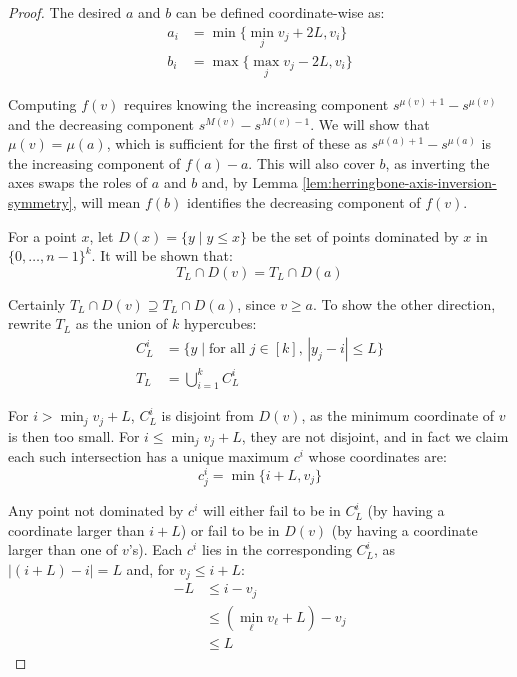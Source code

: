 \documentclass[11pt]{article}
\begin{document}
\lemmaoutsidequerysimulation*
\begin{proof}
    The desired $a$ and $b$ can be defined coordinate-wise as:
    \begin{align}
        a_i &= \min \{ \min_j v_j + 2L, v_i\} \\
        b_i &= \max \{ \max_j v_j - 2L, v_i\}
    \end{align}
    
    Computing $f(v)$ requires knowing the increasing component $s^{\mu(v)+1} - s^{\mu(v)}$ and the decreasing component $s^{M(v)} - s^{M(v)-1}$. We will show that $\mu(v) = \mu(a)$, which is sufficient for the first of these as $s^{\mu(a)+1} - s^{\mu(a)}$ is the increasing component of $f(a) - a$. This will also cover $b$, as inverting the axes swaps the roles of $a$ and $b$ and, by Lemma \ref{lem:herringbone-axis-inversion-symmetry}, will mean $f(b)$ identifies the decreasing component of $f(v)$.

    For a point $x$, let $D(x) = \{ y \mid y \leq x\}$ be the set of points dominated by $x$ in $\{0, \ldots, n-1\}^k$. It will be shown that:
    \begin{equation}
        T_L \cap D(v) = T_L \cap D(a)
    \end{equation}

    Certainly $T_L \cap D(v) \supseteq T_L \cap D(a)$, since $v \geq a$. To show the other direction, rewrite $T_L$ as the union of $k$ hypercubes:
    \begin{align}
        C_L^i &= \{ y \mid \text{for all $j \in [k]$, $|y_j - i| \leq L$}\} \\
        T_L &= \bigcup_{i=1}^k C_L^i
    \end{align}

    For $i > \min_j v_j + L$, $C_L^i$ is disjoint from $D(v)$, as the minimum coordinate of $v$ is then too small. For $i \leq \min_j v_j + L$, they are not disjoint, and in fact we claim each such intersection has a unique maximum $c^i$ whose coordinates are:
    \begin{equation}
        c^i_{j} = \min \{i + L, v_j\}
    \end{equation}

    Any point not dominated by $c^i$ will either fail to be in $C_L^i$ (by having a coordinate larger than $i+L$) or fail to be in $D(v)$ (by having a coordinate larger than one of $v$'s). Each $c^i$ lies in the corresponding $C_L^i$, as $|(i+L) - i| = L$ and, for $v_j \leq i+L$:
    \begin{align}
        -L &\leq i - v_j \\
        &\leq (\min_{\ell} v_{\ell} + L) - v_j \\
        &\leq L
    \end{align}


\end{proof}
\end{document}
